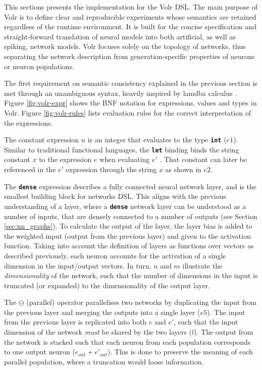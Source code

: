 This sections presents the implementation for the Volr \gls{DSL}. 
The main purpose of Volr is to define clear and reproducible
experiments whose semantics are retained regardless of
the runtime environment.
It is built for the concise specification and straight-forward
translation of neural models into both artificial, as well as
spiking, network models.
Volr focuses solely on the topology of networks, thus
separating the network description from generation-specific
properties of neurons or neuron populations.

The first requirement on semantic consistency explained in the previous section is met through an unambiguous
syntax, heavily inspired by lamdba calculus \cite{Pierce2002}.
Figure \ref{fig:volr-expr} shows the BNF notation for expressions, values and types
in Volr. 
Figure \ref{fig:volr-rules} lists evaluation rules for the correct
interpretation of the expressions.




The constant expression $n$ is an integer that evaluates to the type 
\texttt{\textbf{int}} ($e1$). 
Similar to traditional functional languages, the \texttt{\textbf{let}} binding binds
the string constant $x$ to the expression $e$ when evaluating $e'$ \cite{Pierce2002}.
That constant can later be referenced in the $e'$ expression 
through the string $x$ as shown in $e2$.

The \texttt{\textbf{dense}} expression describes a fully connected
neural network layer, and is the smallest building block for networks
\gls{DSL}.
This aligns with the previous understanding of a layer, where
a \texttt{\textbf{dense}} network layer can be understood as a number of inputs,
that are densely connected to a number of outputs (see Section
\ref{sec:nn_graphs}).
To calculate the output of the layer, the layer bias is added to the
weighted input (output from the previous layer) and given 
to the activation function.
Taking into account the definition of layers as functions over vectors as described previously, each neuron 
accounts for the activation of a single dimension in the input/output vectors.
In turn, $n$ and $m$ illustrate the \textit{dimensionality} of the network,
such that the number of dimensions in the input is truncated (or expanded) to
the dimensionality of the output layer.

The $\ominus$ (parallel) operator parallelises two networks by duplicating
the input from the previous layer and merging the outputs into a single
layer ($e5$).
The input from the previous layer is replicated into both $e$ and $e'$, such
that the input dimension of the network \textit{must} be shared by the two layers ($l$).
The output from the network is stacked such that each neuron from each
population corresponds to one output neuron ($e_{out} + e'_{out}$).
This is done to preserve the meaning of each parallel population, where
a truncation would loose information.

